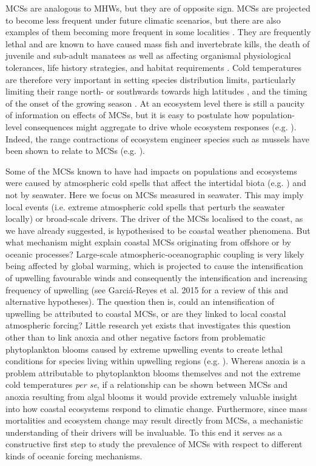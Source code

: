 \documentclass[a4paper,10pt,review]{elsarticle}
\begin{document}
MCSs are analogous to MHWs, but they are of opposite sign. MCSs are projected to become less frequent under future climatic scenarios, but there are also examples of them becoming more frequent in some localities \cite{Gershunov2008, Matthes2015}. They are frequently lethal \cite{Woodward1987} and are known to have caused mass fish \cite{Gunter1941, Gunter1951, Holt1983} and invertebrate \cite{Gunter1951, Crisp1964} kills, the death of juvenile and sub-adult manatees \cite{OShea1985, Marsh1986} as well as affecting organismal physiological tolerances, life history strategies, and habitat requirements \cite{Ellis2015}. Cold temperatures are therefore very important in setting species distribution limits, particularly limiting their range north- or southwards towards high latitudes \cite{Firth2011}, and the timing of the onset of the growing season \cite{Jentsch2007}. At an ecosystem level there is still a paucity of information on effects of MCSs, but it is easy to postulate how population-level consequences might aggregate to drive whole ecosystem responses (e.g. \cite{Kreyling2008, Rehage2016}). Indeed, the range contractions of ecosystem engineer species such as mussels have been shown to relate to MCSs (e.g. \cite{Firth2011, Firth2015}).

Some of the MCSs known to have had impacts on populations and ecosystems were caused by atmospheric cold spells that affect the intertidal biota (e.g. \cite{Gunter1941, Firth2011}) and not by seawater. Here we focus on MCSs measured in seawater. This may imply local events (i.e. extreme atmospheric cold spells that perturb the seawater locally) or broad-scale drivers. The driver of the MCSs localised to the coast, as we have already suggested, is hypothesised to be coastal weather phenomena. But what mechanism might explain coastal MCSs originating from offshore or by oceanic processes? Large-scale atmospheric-oceanographic coupling is very likely being affected by global warming, which is projected to cause the intensification of upwelling favourable winds and consequently the intensification and increasing frequency of upwelling (see Garciá-Reyes et al. 2015 for a review of this and alternative hypotheses). The question then is, could an intensification of upwelling be attributed to coastal MCSs, or are they linked to local coastal atmospheric forcing? Little research yet exists that investigates this question other than to link anoxia and other negative factors from problematic phytoplankton blooms caused by extreme upwelling events to create lethal conditions for species living within upwelling regions (e.g. \cite{Laboy-nieves2001}). Whereas anoxia is a problem attributable to phytoplankton blooms themselves \cite{Diaz2008} and not the extreme cold temperatures \textit{per se}, if a relationship can be shown between MCSs and anoxia resulting from algal blooms it would provide extremely valuable insight into how coastal ecosystems respond to climatic change. Furthermore, since mass mortalities and ecosystem change may result directly from MCSs, a mechanistic understanding of their drivers will be invaluable. To this end it serves as a constructive first step to study the prevalence of MCSs with respect to different kinds of oceanic forcing mechanisms.
\end{document}
